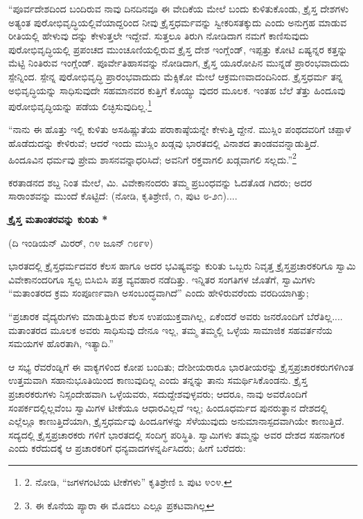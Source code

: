“ಪೂರ್ವದೇಶದಿಂದ ಬಂದಿರುವ ನಾವು ದಿನದಿನವೂ ಈ ವೇದಿಕೆಯ ಮೇಲೆ ಬಂದು ಕುಳಿತುಕೊಂಡು, ಕ್ರೈಸ್ತ ದೇಶಗಳು ಅತ್ಯಂತ ಪುರೋಭಿವೃದ್ಧಿಯಲ್ಲಿವೆಯಾದ್ದರಿಂದ ನೀವು ಕ್ರೈಸ್ತಧರ್ಮವನ್ನು ಸ್ವೀಕರಿಸತಕ್ಕುದು ಎಂದು ಅನುಗ್ರಹ ಮಾಡುವ ರೀತಿಯಲ್ಲಿ ಹೇಳುವು ದನ್ನು ಕೇಳುತ್ತಲೇ ಇದ್ದೇವೆ. ಸುತ್ತಲೂ ತಿರುಗಿ ನೋಡಿದಾಗ ನಮಗೆ ಕಾಣಿಸುವುದು ಪುರೋಭಿವೃದ್ಧಿಯಲ್ಲಿ ಪ್ರಪಂಚದ ಮುಂಚೂಣಿಯಲ್ಲಿರುವ ಕ್ರೈಸ್ತ ದೇಶ ಇಂಗ್ಲೆಂಡ್, ಇಪ್ಪತ್ತು ಕೋಟಿ ಏಷ್ಯನ್ನರ ಕತ್ತನ್ನು ಮೆಟ್ಟಿ ನಿಂತಿರುವ ಇಂಗ್ಲೆಂಡ್. ಪೂರ್ವೇತಿಹಾಸವನ್ನು ನೋಡಿದಾಗ, ಕ್ರೈಸ್ತ ಯೂರೋಪಿನ ಮುನ್ನಡೆ ಪ್ರಾರಂಭವಾದುದು ಸ್ಪೇನ್ನಿಂದ. ಸ್ಪೇನ್ನ ಪುರೋಭಿವೃದ್ಧಿ ಪ್ರಾರಂಭವಾದುದು ಮೆಕ್ಸಿಕೋ ಮೇಲೆ ಆಕ್ರಮಣವಾದಂದಿನಿಂದ. ಕ್ರೈಸ್ತಧರ್ಮ ತನ್ನ ಅಭಿವೃದ್ಧಿಯನ್ನು ಸಾಧಿಸುವುದೇ ಸಹಮಾನವರ ಕುತ್ತಿಗೆ ಕೊಯ್ಯು ವುದರ ಮೂಲಕ. ಇಂತಹ ಬೆಲೆ ತೆತ್ತು ಹಿಂದೂವು ಪುರೋಭಿವೃದ್ಧಿಯನ್ನು ಪಡೆಯ ಲಿಚ್ಛಿಸುವುದಿಲ್ಲ.\footnote{2. ನೋಡಿ, “ಜಗಳಗಂಟಿಯ ಟೀಕೆಗಳು” ಕೃತಿಶ್ರೇಣಿ ೩ ಪುಟ ೪೦೪.}

“ನಾನು ಈ ಹೊತ್ತು ಇಲ್ಲಿ ಕುಳಿತು ಅಸಹಿಷ್ಣುತೆಯ ಪರಾಕಾಷ್ಠೆಯನ್ನೇ ಕೇಳುತ್ತಿ ದ್ದೇನೆ. ಮುಸ್ಲಿಂ ಪಂಥದವರಿಗೆ ಚಪ್ಪಾಳೆ ಹೊಡೆದುದನ್ನು ಕೇಳಿರುವೆ; ಆದರೆ ಇಂದು ಮುಸ್ಲಿಂ ಖಡ್ಗವು ಭಾರತದಲ್ಲಿ ವಿನಾಶದ ತಾಂಡವವನ್ನಾಡುತ್ತಿದೆ. ಹಿಂದೂವಿನ ಧರ್ಮವು ಪ್ರೇಮ ಶಾಸನವನ್ನಾಧರಿಸಿದೆ; ಅವನಿಗೆ ರಕ್ತವಾಗಲಿ ಖಡ್ಗವಾಗಲಿ ಸಲ್ಲದು.”\footnote{3. ಈ ಕೊನೆಯ ಪ್ಯಾರಾ ಈ ಮೊದಲು ಎಲ್ಲೂ ಪ್ರಕಟವಾಗಿಲ್ಲ}

ಕರತಾಡನದ ಶಬ್ದ ನಿಂತ ಮೇಲೆ, ಮಿ. ವಿವೇಕಾನಂದರು ತಮ್ಮ ಪ್ರಬಂಧವನ್ನು ಓದತೊಡ ಗಿದರು; ಅದರ ಸಾರಾಂಶವನ್ನು ಮುಂದೆ ಕೊಟ್ಟಿದೆ: (ನೋಡಿ, ಕೃತಿಶ್ರೇಣಿ, ೧, ಪುಟ ೮-೨೧)....

\begin{center}
\textbf{ಕ್ರೈಸ್ತ ಮತಾಂತರವನ್ನು ಕುರಿತು *}
\end{center}

\begin{center}
(ದಿ ಇಂಡಿಯನ್ ಮಿರರ್, ೧೪ ಜೂನ್ ೧೮೯೪)
\end{center}

ಭಾರತದಲ್ಲಿ ಕ್ರೈಸ್ತಧರ್ಮದವರ ಕೆಲಸ ಹಾಗೂ ಅದರ ಭವಿಷ್ಯವನ್ನು ಕುರಿತು ಒಬ್ಬರು ನಿವೃತ್ತ ಕ್ರೈಸ್ತಪ್ರಚಾರಕರಿಗೂ ಸ್ವಾಮಿ ವಿವೇಕಾನಂದರಿಗೂ ಸ್ವಲ್ಪ ಬಿಸಿಬಿಸಿ ಪತ್ರ ವ್ಯವಹಾರ ನಡೆದಿತ್ತು. ಇನ್ನಿತರ ಸಂಗತಿಗಳ ಜೊತೆಗೆ, ಸ್ವಾಮಿಗಳು “ಮತಾಂತರದ ಕ್ರಮ ಸಂಪೂರ್ಣವಾಗಿ ಅಸಂಬಂದ್ಧವಾಗಿದೆ” ಎಂದು ಹೇಳಿರುವರೆಂದು ವರದಿಯಾಗಿತ್ತು;

“ಪ್ರಚಾರಕ ವೈದ್ಯರುಗಳು ಮಾಡುತ್ತಿರುವ ಕೆಲಸ ಉಪಯುಕ್ತವಾಗಿಲ್ಲ, ಏಕೆಂದರೆ ಅವರು ಜನರೊಂದಿಗೆ ಬೆರೆತಿಲ್ಲ.... ಮತಾಂತರದ ಮೂಲಕ ಅವರು ಸಾಧಿಸುವು ದೇನೂ ಇಲ್ಲ, ತಮ್ಮ ತಮ್ಮಲ್ಲಿ ಒಳ್ಳೆಯ ಸಾಮಾಜಿಕ ಸಹವರ್ತನೆಯ ಸಮಯಗಳ ಹೊರತಾಗಿ, ಇತ್ಯಾದಿ.”

ಆ ಸಭ್ಯ ರೆವರೆಂಡ್ನಿಗೆ ಈ ವಾಕ್ಯಗಳಿಂದ ಕೋಪ ಬಂದಿತು; ದೇಶೀಯರಾರೂ ಭಾರತೀಯರನ್ನು ಕ್ರೈಸ್ತಪ್ರಚಾರಕರುಗಳಿಗಿಂತ ಉತ್ತಮವಾಗಿ ಸಹಾನುಭೂತಿಯಿಂದ ಕಾಣುವುದಿಲ್ಲ ಎಂದು ತನ್ನನ್ನು ತಾನು ಸಮರ್ಥಿಸಿಕೊಂಡನು. ಕ್ರೈಸ್ತ ಪ್ರಚಾರಕರುಗಳು ನಿಸ್ಸಂದೇಹವಾಗಿ ಒಳ್ಳೆಯವರು, ಸದುದ್ದೇಶವುಳ್ಳವರು; ಆದರೂ, ನಾವು ಅವರೊಂದಿಗೆ ಸಂಪರ್ಕದಲ್ಲಿಲ್ಲವೆಂಬ ಸ್ವಾಮಿಗಳ ಟೀಕೆಯೂ ಆಧಾರವಿಲ್ಲದೆ ಇಲ್ಲ; ಹಿಂದೂಧರ್ಮದ ಪುನರುತ್ಥಾನ ದೇಶದಲ್ಲಿ ಎಲ್ಲೆಲ್ಲೂ ಕಾಣುತ್ತಿದೆಯಾಗಿ, ಕ್ರೈಸ್ತಧರ್ಮವು ಹಿಂದೂಗಳನ್ನು ಸೆಳೆಯುವುದು ಅನುಮಾನಾಸ್ಪದವಾಗಿಯೇ ಕಾಣುತ್ತಿದೆ. ಸದ್ಯದಲ್ಲಿ ಕ್ರೈಸ್ತಪ್ರಚಾರಕರು ಗಳಿಗೆ ಭಾರತದಲ್ಲಿ ಸಂದಿಗ್ಧ ಪರಿಸ್ಥಿತಿ. ಸ್ವಾಮಿಗಳು ತಮ್ಮನ್ನು ಅವರ ದೇಶದ ಸಹನಾಗರಿಕ ಎಂದು ಕರೆದುದಕ್ಕೆ ಆ ಪ್ರಚಾರಕರಿಗೆ ಧನ್ಯವಾದಗಳನ್ನರ್ಪಿಸಿದರು; ಹೀಗೆ ಬರೆದರು:


